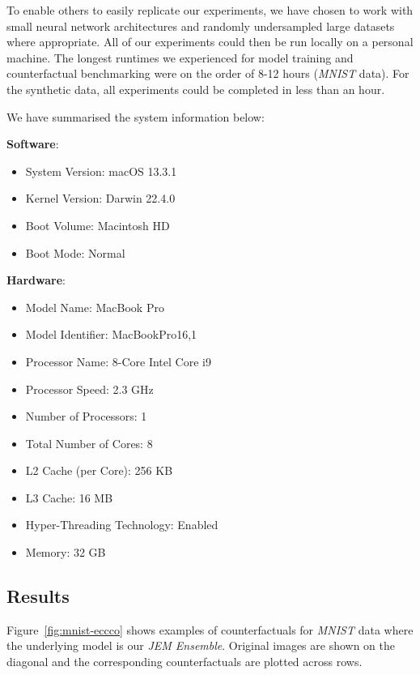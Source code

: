 \documentclass{article}
\begin{document}
To enable others to easily replicate our experiments, we have chosen to work with small neural network architectures and randomly undersampled large datasets where appropriate. All of our experiments could then be run locally on a personal machine. The longest runtimes we experienced for model training and counterfactual benchmarking were on the order of 8-12 hours (\textit{MNIST} data). For the synthetic data, all experiments could be completed in less than an hour. 

We have summarised the system information below:

\textbf{Software}:

\begin{itemize}
  \item System Version: macOS 13.3.1
  \item Kernel Version: Darwin 22.4.0
  \item Boot Volume: Macintosh HD
  \item Boot Mode: Normal
\end{itemize}

\textbf{Hardware}:

\begin{itemize}
  \item Model Name: MacBook Pro
  \item Model Identifier: MacBookPro16,1
  \item Processor Name: 8-Core Intel Core i9
  \item Processor Speed: 2.3 GHz
  \item Number of Processors: 1
  \item Total Number of Cores: 8
  \item L2 Cache (per Core): 256 KB
  \item L3 Cache: 16 MB
  \item Hyper-Threading Technology: Enabled
  \item Memory: 32 GB
\end{itemize}


\subsection{Results}\label{app:results}

Figure~\ref{fig:mnist-eccco} shows examples of counterfactuals for \textit{MNIST} data where the underlying model is our \textit{JEM Ensemble}. Original images are shown on the diagonal and the corresponding counterfactuals are plotted across rows.
\end{document}
